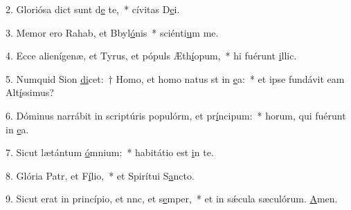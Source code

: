 2. Gloriósa dict sunt d\uline{e} te,~* cívitas D\uline{e}i.\par 
3. Memor ero Rahab, et Bbyl\uline{ó}nis~* sciénti\uline{u}m me.\par 
4. Ecce alienígenæ, et Tyrus, et pópuls Æth\uline{í}opum,~* hi fuérunt \uline{i}llic.\par 
5. Numquid Sion \uline{di}cet:~† Homo, et homo natus st in \uline{e}a:~* et ipse fundávit eam Alt\uline{í}ssimus?\par 
6. Dóminus narrábit in scriptúris populórm, et pr\uline{í}ncipum:~* horum, qui fuérunt in \uline{e}a.\par 
7. Sicut lætántum \uline{ó}mnium:~* habitátio est \uline{i}n te.\par 
8. Glória Patr, et F\uline{í}lio,~* et Spirítui S\uline{a}ncto.\par 
9. Sicut erat in princípio, et nnc, et s\uline{e}mper,~* et in sǽcula sæculórum. \uline{A}men.\par 
